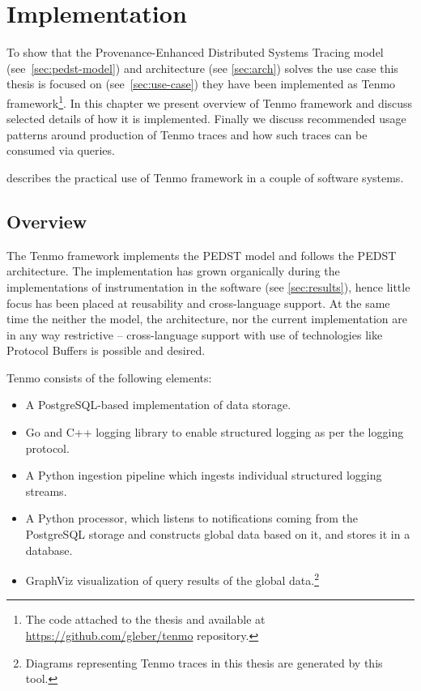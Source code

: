 \newpage
\chapter{Implementation}\label{sec:impl}

To show that the Provenance-Enhanced Distributed Systems Tracing model (see~\cref{sec:pedst-model}) and architecture (see \cref{sec:arch}) solves the use case this thesis is focused on (see~\cref{sec:use-case}) they have been implemented as Tenmo framework\footnote{The code attached to the thesis and available at \url{https://github.com/gleber/tenmo} repository.}. In this chapter we present overview of Tenmo framework and discuss selected details of how it is implemented. Finally we discuss recommended usage patterns around production of Tenmo traces and how such traces can be consumed via queries.

 describes the practical use of Tenmo framework in a couple of software systems.

\section{Overview}

The Tenmo framework implements the PEDST model and follows the PEDST architecture. The implementation has grown organically during the implementations of instrumentation in the software (see \cref{sec:results}), hence little focus has been placed at reusability and cross-language support. At the same time the neither the model, the architecture, nor the current implementation are in any way restrictive -- cross-language support with use of technologies like Protocol Buffers is possible and desired.

Tenmo consists of the following elements:
%
\begin{itemize}
	\item A PostgreSQL-based implementation of data storage.
	\item Go and C++ logging library to enable structured logging as per the logging protocol.
	\item A Python ingestion pipeline which ingests individual structured logging streams.
	\item A Python processor, which listens to notifications coming from the PostgreSQL storage and constructs global data based on it, and stores it in a database.
	\item GraphViz visualization of query results of the global data.\footnote{Diagrams representing Tenmo traces in this thesis are generated by this tool.}
\end{itemize}

